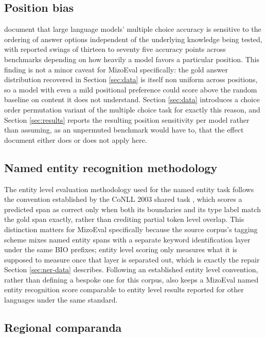 \documentclass[11pt,a4paper]{article}
\begin{document}
\subsection{Position bias}

\citet{pezeshkpour2024positionbias} document that large language models' multiple choice accuracy is sensitive to the ordering of answer options independent of the underlying knowledge being tested, with reported swings of thirteen to seventy five accuracy points across benchmarks depending on how heavily a model favors a particular position. This finding is not a minor caveat for MizoEval specifically: the gold answer distribution recovered in Section \ref{sec:data} is itself non uniform across positions, so a model with even a mild positional preference could score above the random baseline on content it does not understand. Section \ref{sec:data} introduces a choice order permutation variant of the multiple choice task for exactly this reason, and Section \ref{sec:results} reports the resulting position sensitivity per model rather than assuming, as an unpermuted benchmark would have to, that the effect \citet{pezeshkpour2024positionbias} document either does or does not apply here.

\subsection{Named entity recognition methodology}

The entity level evaluation methodology used for the named entity task follows the convention established by the CoNLL 2003 shared task \citep{tjongkimsang2003conll}, which scores a predicted span as correct only when both its boundaries and its type label match the gold span exactly, rather than crediting partial token level overlap. This distinction matters for MizoEval specifically because the source corpus's tagging scheme mixes named entity spans with a separate keyword identification layer under the same BIO prefixes; entity level scoring only measures what it is supposed to measure once that layer is separated out, which is exactly the repair Section \ref{sec:ner-data} describes. Following an established entity level convention, rather than defining a bespoke one for this corpus, also keeps a MizoEval named entity recognition score comparable to entity level results reported for other languages under the same standard.

\subsection{Regional comparanda}
\end{document}
